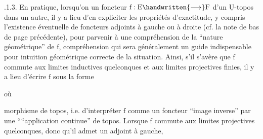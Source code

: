 .1.3. En pratique, lorsqu'on un foncteur $\mathrm{f}:\mathrm{E}\handwritten{\longrightarrow}\mathrm{F}$ d'un $\underline{\mathrm{U}}$-topos dans un autre, il y a lieu d'en expliciter  les propriétés d'exactitude,  y compris l'existence éventuelle de foncteurs adjoints à gauche ou à droite (cf. la note de bas de page précédente), pour parvenir à une compréhension de la ``nature géométrique'' de $\mathrm{f}$,  compréhension qui sera généralement un guide indispensable pour intuition géométrique correcte de la situation. Ainsi, s'il s'avère que $\mathrm{f}$ commute aux limites inductives quelconques et aux limites projectives finies, il y a lieu d'écrire $\mathrm{f}$ sous la forme
où
morphisme de topos, i.e. d'interpréter $\mathrm{f}$ comme un foncteur ``image inverse'' par une ````application continue'' de topos. Lorsque $\mathrm{f}$ commute aux limites projectives quelconques, donc qu'il admet un adjoint à gauche,
